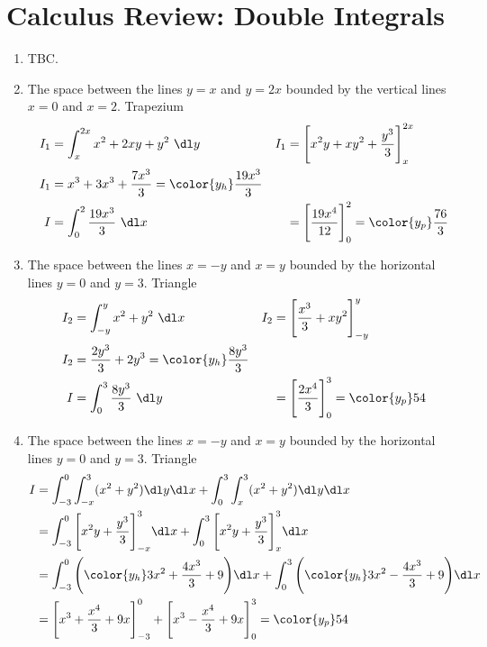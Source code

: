 \section{Calculus Review: Double Integrals}

\begin{enumerate}
    \item TBC.

    \item The space between the lines $ y = x $ and $ y = 2x $ bounded by the vertical
          lines $ x = 0 $ and $ x = 2 $. Trapezium
          \begin{align}
              I_1 & = \int_{x}^{2x} x^2 + 2xy + y^2\ \dl y                          &
              I_1 & = \Bigg[ x^2 y + xy^2 + \frac{y^3}{3} \Bigg]_x^{2x}               \\
              I_1 & = x^3 + 3x^3 + \frac{7x^3}{3} = \color{y_h} \frac{19x^3}{3}       \\
              I   & = \int_{0}^{2} \frac{19x^3}{3}\ \dl x                           &
                  & = \Bigg[ \frac{19x^4}{12} \Bigg]_0^2 = \color{y_p} \frac{76}{3}
          \end{align}

    \item The space between the lines $ x = -y $ and $ x = y $ bounded by the horizontal
          lines $ y = 0 $ and $ y = 3 $. Triangle
          \begin{align}
              I_2 & = \int_{-y}^{y} x^2 + y^2\ \dl x                     &
              I_2 & = \Bigg[ \frac{x^3}{3} + xy^2 \Bigg]_{-y}^{y}          \\
              I_2 & = \frac{2y^3}{3} + 2y^3 = \color{y_h} \frac{8y^3}{3}   \\
              I   & = \int_{0}^{3} \frac{8y^3}{3}\ \dl y                 &
                  & = \Bigg[ \frac{2x^4}{3} \Bigg]_0^3 = \color{y_p} 54
          \end{align}

    \item The space between the lines $ x = -y $ and $ x = y $ bounded by the horizontal
          lines $ y = 0 $ and $ y = 3 $. Triangle
          \begin{align}
              I & = \int_{-3}^{0}\int_{-x}^{3} (x^2 + y^2) \dl y \dl x
              + \int_{0}^{3}\int_{x}^{3} (x^2 + y^2) \dl y \dl x                     \\
                & = \int_{-3}^{0} \Bigg[ x^2 y + \frac{y^3}{3} \Bigg]_{-x}^{3} \dl x
              + \int_{0}^{3} \Bigg[ x^2y + \frac{y^3}{3} \Bigg]_x^3 \dl x            \\
                & = \int_{-3}^{0} \Bigg( {\color{y_h} 3x^2 + \frac{4x^3}{3} + 9}
              \Bigg) \dl x
              + \int_{0}^{3} \Bigg( {\color{y_h} 3x^2 - \frac{4x^3}{3} + 9}
              \Bigg) \dl x                                                           \\
                & = \Bigg[x^3 + \frac{x^4}{3} + 9x\Bigg]_{-3}^0
              + \Bigg[x^3 - \frac{x^4}{3} + 9x\Bigg]_{0}^3  = \color{y_p} 54
          \end{align}


\end{enumerate}
